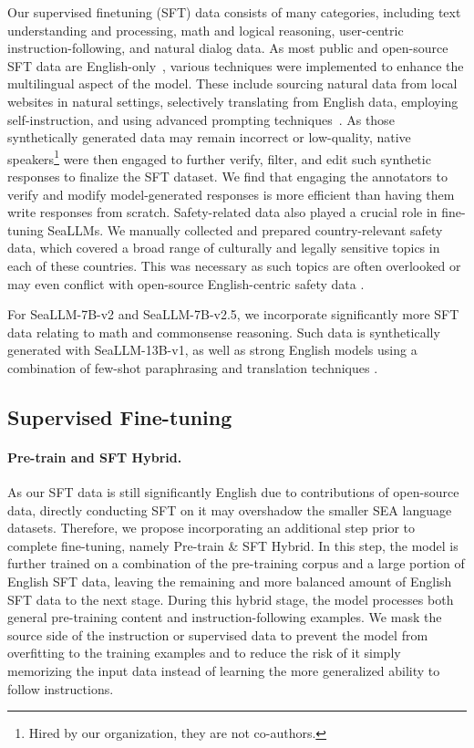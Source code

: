 Our supervised finetuning (SFT) data consists of many categories, including text understanding and processing, math and logical reasoning, user-centric instruction-following, and natural dialog data. As most public and open-source SFT data are English-only~\citep{flan_collection_longpre2023,openorca,orca_mukherjee2023orca,platypus2023}, various techniques were implemented to enhance the multilingual aspect of the model. These include sourcing natural data from local websites in natural settings, selectively translating from English data, employing self-instruction, and using advanced prompting techniques~\citep{self_instruct_wang2022self,self_refine_madaan2023self,democratize_llm_ldp_nguyen2023}. As those synthetically generated data may remain incorrect or low-quality, native speakers\footnote{Hired by our organization, they are not co-authors.} were then engaged to further verify, filter, and edit such synthetic responses to finalize the SFT dataset. We find that engaging the annotators to verify and modify model-generated responses is more efficient than having them write responses from scratch. Safety-related data also played a crucial role in fine-tuning SeaLLMs. We manually collected and prepared country-relevant safety data, which covered a broad range of culturally and legally sensitive topics in each of these countries. This was necessary as such topics are often overlooked or may even conflict with open-source English-centric safety data \cite{multilingual_jailbreak_deng2023}. 

For SeaLLM-7B-v2 and SeaLLM-7B-v2.5, we incorporate significantly more SFT data relating to math and commonsense reasoning. Such data is synthetically generated with SeaLLM-13B-v1, as well as strong English models \citep{jiang2024mixtral,qwen_bai2023} using a combination of few-shot paraphrasing and translation techniques \citep{yu2023metamath}.

\subsection{Supervised Fine-tuning}\label{sec:sft:pretrain_sft}

\paragraph{Pre-train and SFT Hybrid.} As our SFT data is still significantly English due to contributions of open-source data, directly conducting SFT on it may overshadow the smaller SEA language datasets. Therefore, we propose incorporating an additional step prior to complete fine-tuning, namely Pre-train \& SFT Hybrid. In this step, the model is further trained on a combination of the pre-training corpus and a large portion of English SFT data, leaving the remaining and more balanced amount of English SFT data to the next stage. During this hybrid stage, the model processes both general pre-training content and instruction-following examples. We mask the source side of the instruction or supervised data to prevent the model from overfitting to the training examples and to reduce the risk of it simply memorizing the input data instead of learning the more generalized ability to follow instructions.

